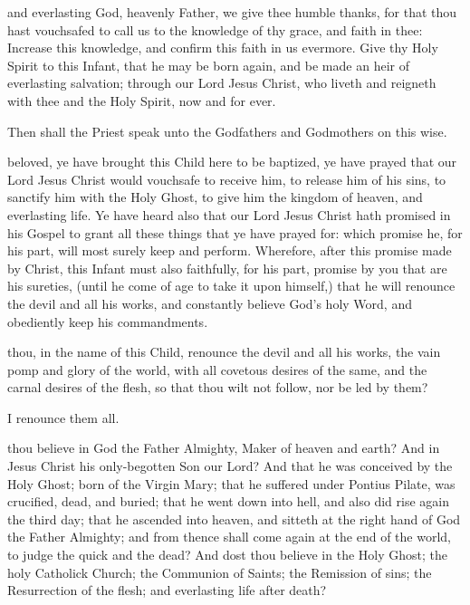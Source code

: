  and everlasting God, heavenly Father, we give thee humble thanks, for that thou hast vouchsafed to call us to the knowledge of thy grace, and faith in thee: Increase this knowledge, and confirm this faith in us evermore. Give thy Holy Spirit to this Infant, that he may be born again, and be made an heir of everlasting salvation; through our Lord Jesus Christ, who liveth and reigneth with thee and the Holy Spirit, now and for ever.

\begin{rubric}
Then shall the Priest speak unto the Godfathers and Godmothers on this wise.
\end{rubric}

 beloved, ye have brought this Child here to be baptized, ye have prayed that our Lord Jesus Christ would vouchsafe to receive him, to release him of his sins, to sanctify him with the Holy Ghost, to give him the kingdom of heaven, and everlasting life. Ye have heard also that our Lord Jesus Christ hath promised in his Gospel to grant all these things that ye have prayed for: which promise he, for his part, will most surely keep and perform. Wherefore, after this promise made by Christ, this Infant must also faithfully, for his part, promise by you that are his sureties, (until he come of age to take it upon himself,) that he will renounce the devil and all his works, and constantly believe God's holy Word, and obediently keep his commandments.
\\


 thou, in the name of this Child, renounce the devil and all his works, the vain pomp and glory of the world, with all covetous desires of the same, and the carnal desires of the flesh, so that thou wilt not follow, nor be led by them?

 I renounce them all.

 thou believe in God the Father Almighty, Maker of heaven and earth?
And in Jesus Christ his only-begotten Son our Lord? And that he was conceived by the Holy Ghost; born of the Virgin Mary; that he suffered under Pontius Pilate, was crucified, dead, and buried; that he went down into hell, and also did rise again the third day; that he ascended into heaven, and sitteth at the right hand of God the Father Almighty; and from thence shall come again at the end of the world, to judge the quick and the dead?
And dost thou believe in the Holy Ghost; the holy Catholick Church; the Communion of Saints; the Remission of sins; the Resurrection of the flesh; and everlasting life after death?

